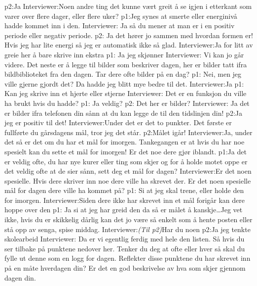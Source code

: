 \documentclass[11pt, norsk, a4paper]{article}
\begin{document}
\textcolor{myYellow} {p2:}Ja
\textcolor{myBlue} {Interviewer:}Noen andre ting det kunne vært greit å se igjen i etterkant som varer over flere dager, eller flere uker? 
\textcolor{myGreen} {p1:}Jeg synes at smerte eller energinivå hadde kommet inn i den. 
\textcolor{myBlue} {Interviewer:} Ja så du mener at man er i en positiv periode eller negativ periode. 
\textcolor{myYellow} {p2:} Ja det hører jo sammen med hvordan formen er! Hvis jeg har lite energi så jeg er automatisk ikke så glad. 
\textcolor{myBlue} {Interviewer:}Ja for litt av greie her å bare skrive inn ekstra
\textcolor{myGreen} {p1:} Ja jeg skjønner
\textcolor{myBlue} {Interviewer:} Vi kan jo går videre. Det neste er å legge til bilder som beskriver dagen, her er bilder tatt ifra bildbiblioteket fra den dagen. Tar dere ofte bilder på en dag?
\textcolor{myGreen} {p1:} Nei, men jeg ville gjerne gjordt det? Da hadde jeg blitt mye bedre til det. 
\textcolor{myBlue} {Interviewer:}Ja
\textcolor{myGreen} {p1:} Kan jeg skrive inn et hjerte eller stjerne
\textcolor{myBlue} {Interviewer:} Det er en funksjon du ville ha brukt hvis du hadde?
\textcolor{myGreen} {p1:} Ja veldig?
\textcolor{myYellow} {p2:} Det her er bilder?
\textcolor{myBlue} {Interviewer:} Ja det er bilder ifra telefonen din sånn at du kan legge de til den tidslinjen din!
\textcolor{myYellow} {p2:}Ja jeg er positiv til det!
\textcolor{myBlue} {Interviewer:}Under det er det to punkter. Det første er fullførte du gårsdagens mål, tror jeg det står.
\textcolor{myYellow} {p2:}Målet igår!
\textcolor{myBlue} {Interviewer:}Ja, under det så er det om du har et mål for imorgen. Tankegangen er at hvis du har noe spesielt kan du sette et mål for imorgen! Er det noe dere gjør iblandt.
\textcolor{myGreen} {p1:}Ja det er veldig ofte, du har nye kurer eller ting som skjer og for å holde motet oppe er det veldig ofte at de sier sånn, sett deg et mål for dagen?
\textcolor{myBlue} {Interviewer:}Er det noen spesielle. Hvis dere skriver inn noe dere ville ha skrevet der. Er det noen spesielle mål for dagen dere ville ha kommet på?
\textcolor{myGreen} {p1:} Si at jeg skal trene, eller holde den for imorgen. 
\textcolor{myBlue} {Interviewer:}Siden dere ikke har skrevet inn et mål forigår kan dere hoppe over den
\textcolor{myGreen} {p1:} Ja si at jeg har greid den da så er målet å kanskje\dots Jeg vet ikke, hvis du er skikkelig dårlig kan det jo være så enkelt som å hente posten eller stå opp av senga, spise middag.
\textcolor{myBlue} {Interviewer:}\textcolor{myGrey}{\textit{(Til p2)}}Har du noen
\textcolor{myYellow} {p2:}Ja jeg tenkte skolearbeid
\textcolor{myBlue} {Interviewer:} Da er vi egentlig ferdig med hele den listen. Så hvis du ser tilbake på punktene nedover her. Tenker du deg at ofte eller hver så skal du fylle ut denne som en logg for dagen. Reflekter disse punktene du har skrevet inn på en måte hverdagen din? Er det en god beskrivelse av hva som skjer gjennom dagen din.
\end{document}
